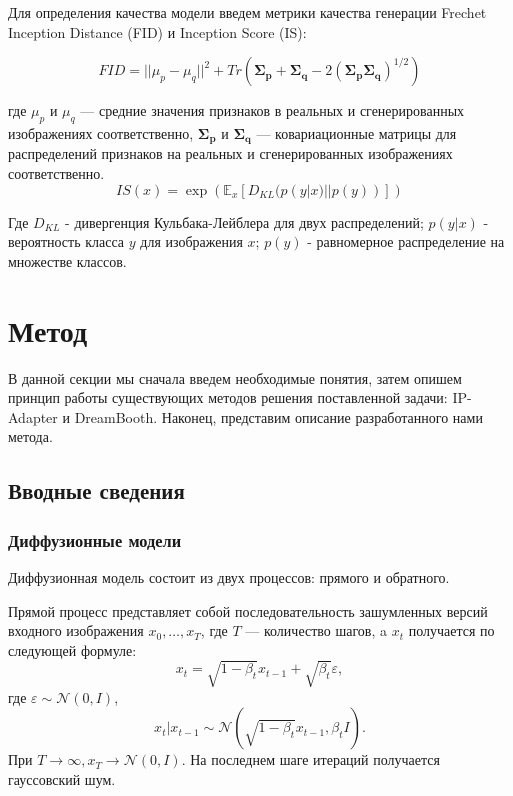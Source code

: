 \documentclass{article}
\begin{document}
Для определения качества модели введем метрики качества генерации Frechet Inception Distance (FID)\cite{DBLP:journals/corr/HeuselRUNKH17} и Inception Score (IS)\cite{DBLP:journals/corr/SalimansGZCRC16}: 

\begin{equation}
FID = ||\mu_p - \mu_q||^2 + Tr(\mathbf{\Sigma_p} + \mathbf{\Sigma_q} - 2(\mathbf{\Sigma_p}\mathbf{\Sigma_q})^{1/2})
\end{equation}

где \( \mu_p \) и \( \mu_q \) --- средние значения признаков в реальных и сгенерированных изображениях соответственно, \( \mathbf{\Sigma_p} \) и \( \mathbf{\Sigma_q} \) --- ковариационные матрицы для распределений признаков на реальных и сгенерированных изображениях соответственно.
\begin{equation}
IS(x) = \exp(\mathbb{E}_x \left[ D_{KL}(p(y | x) || p(y)) \right] )
\end{equation}

Где \( D_{KL} \) - дивергенция Кульбака-Лейблера для двух распределений; \(p(y|x)\) - вероятность класса \(y\) для изображения \(x\); \(p(y)\) - равномерное распределение на множестве классов.

\section{Метод}
В данной секции мы сначала введем необходимые понятия, затем опишем принцип работы существующих методов решения поставленной задачи: IP-Adapter и DreamBooth. Наконец, представим описание разработанного нами метода.
\subsection{Вводные сведения}
\subsubsection{Диффузионные модели}
Диффузионная модель состоит из двух процессов: прямого и обратного.

Прямой процесс представляет собой последовательность зашумленных версий входного изображения $x_0, \dots, x_T$, где $T$ --- количество шагов, a $x_t$ получается по следующей формуле: 
\begin{equation}
x_t = \sqrt{1-\beta_t}x_{t-1}+\sqrt{\beta_t}\varepsilon,
\end{equation}
где $\varepsilon \sim \mathcal{N}(0, I)$, 
\begin{equation}
x_t|x_{t-1} \sim \mathcal{N}(\sqrt{1-\beta_t}x_{t-1}, \beta_t I).
\end{equation}
При $T \rightarrow \infty, x_T \rightarrow \mathcal{N}(0, I).$ На последнем шаге итераций получается гауссовский шум. 
\end{document}
